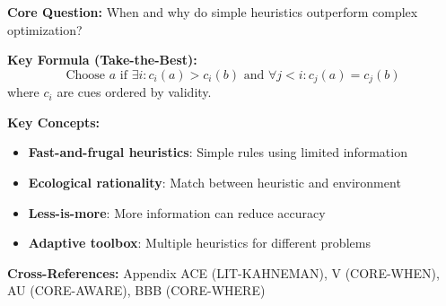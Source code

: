 \begin{tcolorbox}[colback=blue!5!white, colframe=blue!75!black,
    title=Quick Reference: LIT-GIGERENZER]

\textbf{Core Question:} When and why do simple heuristics outperform complex optimization?

\textbf{Key Formula (Take-the-Best):}
\begin{equation}
\text{Choose } a \text{ if } \exists i: c_i(a) > c_i(b) \text{ and } \forall j < i: c_j(a) = c_j(b)
\end{equation}
where $c_i$ are cues ordered by validity.

\textbf{Key Concepts:}
\begin{itemize}[nosep]
\item \textbf{Fast-and-frugal heuristics}: Simple rules using limited information
\item \textbf{Ecological rationality}: Match between heuristic and environment
\item \textbf{Less-is-more}: More information can reduce accuracy
\item \textbf{Adaptive toolbox}: Multiple heuristics for different problems
\end{itemize}

\textbf{Cross-References:} Appendix ACE (LIT-KAHNEMAN), V (CORE-WHEN), AU (CORE-AWARE), BBB (CORE-WHERE)
\end{tcolorbox}



